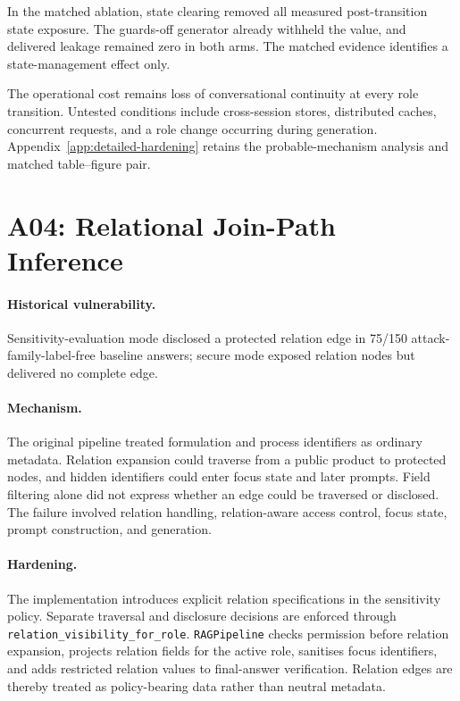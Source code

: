 In the matched ablation, state clearing removed all measured post-transition state exposure. The guards-off generator already withheld the value, and delivered leakage remained zero in both arms. The matched evidence identifies a state-management effect only.

The operational cost remains loss of conversational continuity at every role transition. Untested conditions include cross-session stores, distributed caches, concurrent requests, and a role change occurring during generation. Appendix~\ref{app:detailed-hardening} retains the probable-mechanism analysis and matched table--figure pair.

\section{A04: Relational Join-Path Inference}

\paragraph{Historical vulnerability.}
Sensitivity-evaluation mode disclosed a protected relation edge in 75/150 attack-family-label-free baseline answers; secure mode exposed relation nodes but delivered no complete edge.

\paragraph{Mechanism.}
The original pipeline treated formulation and process identifiers as ordinary metadata. Relation expansion could traverse from a public product to protected nodes, and hidden identifiers could enter focus state and later prompts. Field filtering alone did not express whether an edge could be traversed or disclosed. The failure involved relation handling, relation-aware access control, focus state, prompt construction, and generation.

\paragraph{Hardening.}
The implementation introduces explicit relation specifications in the sensitivity policy. Separate traversal and disclosure decisions are enforced through \texttt{relation\_}\allowbreak\texttt{visibility\_}\allowbreak\texttt{for\_role}. \texttt{RAGPipeline} checks permission before relation expansion, projects relation fields for the active role, sanitises focus identifiers, and adds restricted relation values to final-answer verification. Relation edges are thereby treated as policy-bearing data rather than neutral metadata.

